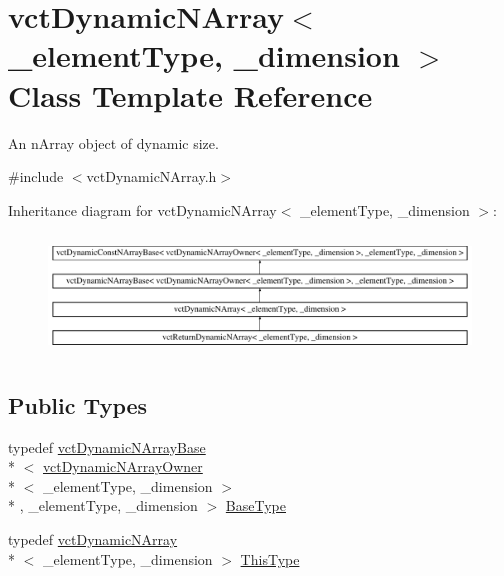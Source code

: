 \hypertarget{classvct_dynamic_n_array}{\section{vct\-Dynamic\-N\-Array$<$ \-\_\-element\-Type, \-\_\-dimension $>$ Class Template Reference}
\label{classvct_dynamic_n_array}
}


An n\-Array object of dynamic size.  




{\ttfamily \#include $<$vct\-Dynamic\-N\-Array.\-h$>$}

Inheritance diagram for vct\-Dynamic\-N\-Array$<$ \-\_\-element\-Type, \-\_\-dimension $>$\-:\begin{figure}[H]
\begin{center}
\leavevmode
\includegraphics[height=3.241679cm]{d1/d56/classvct_dynamic_n_array}
\end{center}
\end{figure}
\subsection*{Public Types}
\begin{DoxyCompactItemize}
\item 
typedef \hyperlink{classvct_dynamic_n_array_base}{vct\-Dynamic\-N\-Array\-Base}\\*
$<$ \hyperlink{classvct_dynamic_n_array_owner}{vct\-Dynamic\-N\-Array\-Owner}\\*
$<$ \-\_\-element\-Type, \-\_\-dimension $>$\\*
, \-\_\-element\-Type, \-\_\-dimension $>$ \hyperlink{classvct_dynamic_n_array_adc62cbbc97a16fa388dd96d4404fd075}{Base\-Type}
\item 
typedef \hyperlink{classvct_dynamic_n_array}{vct\-Dynamic\-N\-Array}\\*
$<$ \-\_\-element\-Type, \-\_\-dimension $>$ \hyperlink{classvct_dynamic_n_array_a159dfdd698115f12caf629f7539029f5}{This\-Type}
\end{DoxyCompactItemize}
